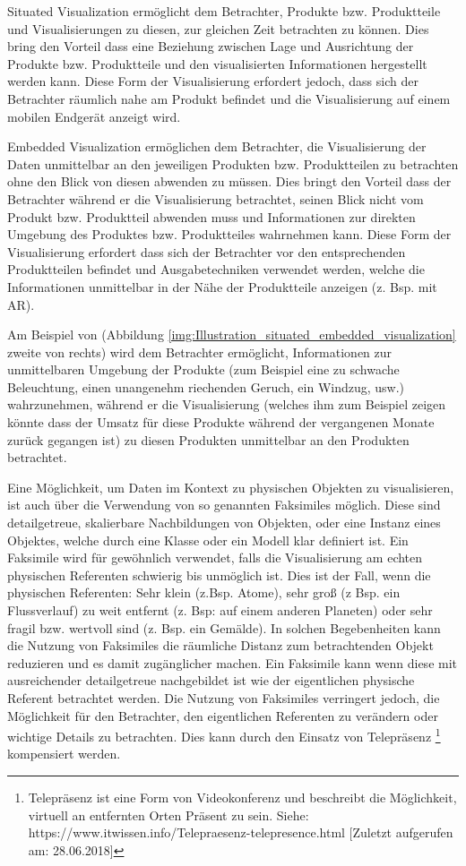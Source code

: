 Situated Visualization ermöglicht dem Betrachter, Produkte bzw. Produktteile und Visualisierungen zu diesen, zur gleichen Zeit betrachten zu können. Dies bring den Vorteil dass eine Beziehung 
zwischen Lage und Ausrichtung der Produkte bzw. Produktteile und den visualisierten Informationen hergestellt werden kann. Diese Form der Visualisierung erfordert jedoch, dass sich 
der Betrachter räumlich nahe am Produkt befindet und die Visualisierung auf einem mobilen Endgerät anzeigt wird.

Embedded Visualization ermöglichen dem Betrachter, die Visualisierung der Daten unmittelbar an den jeweiligen Produkten bzw. Produktteilen zu betrachten ohne den Blick von diesen abwenden zu müssen. 
Dies bringt den Vorteil dass der Betrachter während er die Visualisierung betrachtet, seinen Blick nicht vom Produkt bzw. Produktteil abwenden muss und Informationen zur direkten Umgebung des Produktes bzw. Produktteiles wahrnehmen kann. Diese Form der Visualisierung erfordert dass sich der Betrachter vor den entsprechenden Produktteilen befindet und Ausgabetechniken verwendet werden, welche die Informationen unmittelbar in der Nähe der 
Produktteile anzeigen (z. Bsp. mit AR).

Am Beispiel von (Abbildung \ref{img:Illustration_situated_embedded_visualization} zweite von rechts) wird dem Betrachter ermöglicht, Informationen zur unmittelbaren Umgebung der Produkte (zum Beispiel eine zu schwache Beleuchtung, einen unangenehm riechenden Geruch, ein Windzug, usw.) wahrzunehmen, während er die Visualisierung (welches ihm zum Beispiel zeigen könnte dass der Umsatz für diese Produkte während der vergangenen Monate zurück gegangen ist) zu diesen Produkten unmittelbar an den Produkten betrachtet.  

\cite{Willett2017}Eine Möglichkeit, um Daten im Kontext zu physischen Objekten zu visualisieren, ist auch über die Verwendung von so genannten Faksimiles möglich. Diese sind detailgetreue, skalierbare Nachbildungen von Objekten, oder eine Instanz eines Objektes, welche durch eine Klasse oder ein Modell klar definiert ist. Ein Faksimile wird für gewöhnlich verwendet, falls die Visualisierung am echten physischen Referenten schwierig bis unmöglich ist. Dies ist der Fall, wenn die physischen Referenten: Sehr klein (z.Bsp. Atome), sehr groß (z Bsp. ein Flussverlauf) zu weit entfernt (z. Bsp: auf einem anderen Planeten) oder sehr fragil bzw. wertvoll sind (z. Bsp. ein Gemälde). 
In solchen Begebenheiten kann die Nutzung von Faksimiles die räumliche Distanz zum betrachtenden Objekt reduzieren und es damit zugänglicher machen. Ein Faksimile kann wenn diese mit ausreichender detailgetreue nachgebildet ist wie der eigentlichen physische Referent betrachtet werden. Die Nutzung von Faksimiles verringert jedoch, die Möglichkeit für den Betrachter, den eigentlichen Referenten zu verändern oder wichtige Details zu betrachten. Dies kann durch den Einsatz von Telepräsenz \footnote{Telepräsenz ist eine Form von Videokonferenz und beschreibt die Möglichkeit, virtuell an entfernten Orten Präsent zu sein. Siehe: https://www.itwissen.info/Telepraesenz-telepresence.html [Zuletzt aufgerufen am: 28.06.2018]} kompensiert werden. 


